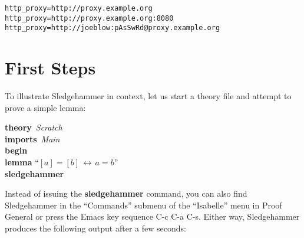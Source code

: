 \documentclass[a4paper,12pt]{article}
\begin{document}
\prew
\texttt{http\_proxy=http://proxy.example.org} \\
\texttt{http\_proxy=http://proxy.example.org:8080} \\
\texttt{http\_proxy=http://joeblow:pAsSwRd@proxy.example.org}
\postw

\section{First Steps}
\label{first-steps}

To illustrate Sledgehammer in context, let us start a theory file and
attempt to prove a simple lemma:

\prew
\textbf{theory}~\textit{Scratch} \\
\textbf{imports}~\textit{Main} \\
\textbf{begin} \\[2\smallskipamount]
%
\textbf{lemma} ``$[a] = [b] \,\longleftrightarrow\, a = b$'' \\
\textbf{sledgehammer}
\postw

Instead of issuing the \textbf{sledgehammer} command, you can also find
Sledgehammer in the ``Commands'' submenu of the ``Isabelle'' menu in Proof
General or press the Emacs key sequence C-c C-a C-s.
Either way, Sledgehammer produces the following output after a few seconds:
\end{document}
